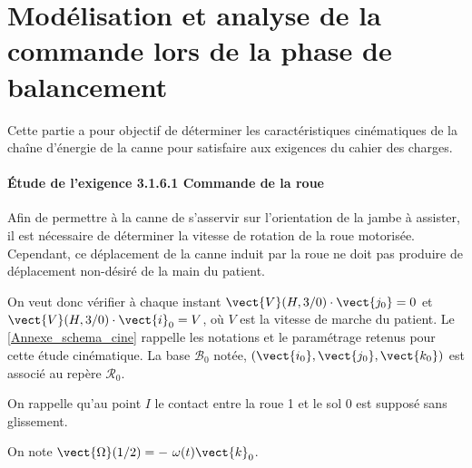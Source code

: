 \ifprof
\else
\newpage

\section{Modélisation et analyse de la commande lors de la phase de balancement}
Cette partie a pour objectif de déterminer les caractéristiques cinématiques de la chaîne d'énergie de la canne pour satisfaire aux exigences du cahier des charges.

\paragraph{Étude de l'exigence 3.1.6.1 \og Commande de la roue\fg{}}

\noindent Afin de permettre à la canne de s'asservir sur l'orientation de la jambe à assister, il est nécessaire de déterminer la vitesse de rotation de la roue motorisée. Cependant, ce déplacement de la canne induit par la roue ne doit pas produire de déplacement non-désiré de la main du patient.

On veut donc vérifier à chaque instant $\vect{V}(H,3/0)\cdot\vect{j_0} = 0$ et $\vect{V}(H,3/0)\cdot\vect{i}_0 = V$, où $V$ est la vitesse de marche du patient. Le \ref{Annexe_schema_cine} rappelle les notations et le paramétrage retenus pour cette étude cinématique. La base $\mathcal{B}_0$ notée, $(\vect{i_0}, \vect{j_0}, \vect {k_0})$ est associé au repère $\mathcal{R}_0$.

On rappelle qu'au point $I$ le contact entre la roue 1 et le sol 0 est supposé sans glissement.

On note $\vect{\Omega}(1/2)= -\ \omega(t)\vect{k}_0$.
\fi


\ifprof
{}
\fi


